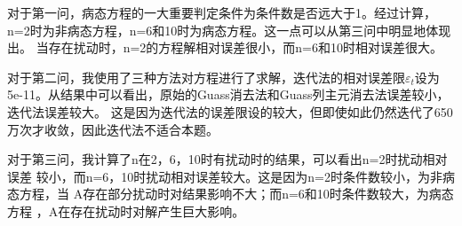 \documentclass[a4paper,12pt]{ctexart}
\begin{document}

\par
对于第一问，病态方程的一大重要判定条件为条件数是否远大于1。经过计算，
n=2时为非病态方程，n=6和10时为病态方程。这一点可以从第三问中明显地体现出。
当存在扰动时，n=2的方程解相对误差很小，而n=6和10时相对误差很大。
\par
对于第二问，我使用了三种方法对方程进行了求解，迭代法的相对误差限$\varepsilon_t$设为
5e-11。从结果中可以看出，原始的Guass消去法和Guass列主元消去法误差较小，迭代法误差较大。
这是因为迭代法的误差限设的较大，但即使如此仍然迭代了650万次才收敛，因此迭代法不适合本题。
\par
对于第三问，我计算了n在2，6，10时有扰动时的结果，可以看出n=2时扰动相对误差
较小，而n=6，10时扰动相对误差较大。这是因为n=2时条件数较小，为非病态方程，当
A存在部分扰动时对结果影响不大；而n=6和10时条件数较大，为病态方程
，A在存在扰动时对解产生巨大影响。
\end{document}
